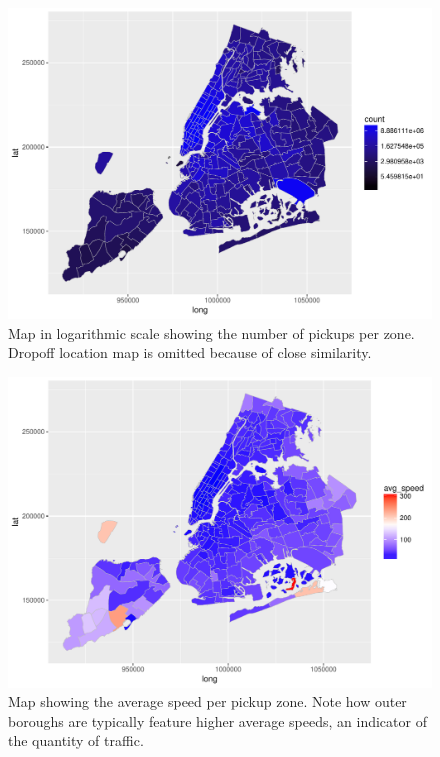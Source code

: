 \documentclass{acm_proc_article-sp-sigmod09}
\begin{document}
\begin{figure}
	\centering
	\includegraphics[width=1\columnwidth]{resources/base_plots/pickup_location_id_dist_map.pdf}
	\caption{Map in logarithmic scale showing the number of pickups per zone. Dropoff location map is omitted because of close similarity.}
	\label{fig:pickupDistributionMap}
\end{figure}

\begin{figure}
	\centering
	\includegraphics[width=1\columnwidth]{resources/base_plots/avg_speed_by_pickup_location_map.pdf}
	\caption{Map showing the average speed per pickup zone. Note how outer boroughs are typically feature higher average speeds, an indicator of the quantity of traffic.}
	\label{fig:speedMap}
\end{figure}
\end{document}
